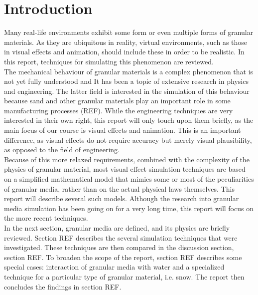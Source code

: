 
\ifx\isEmbedded\undefined

\graphicspath{{../img/}}

\fi

\section{Introduction}
Many real-life environments exhibit some form or even multiple forms of granular materials. As they are ubiquitous in reality, virtual environments, such as those in visual effects and animation, should include these in order to be realistic. In this report, techniques for simulating this phenomenon are reviewed.\\

The mechanical behaviour of granular materials is a complex phenomenon that is not yet fully understood and It has been a topic of extensive research in physics and engineering. The latter field is interested in the simulation of this behaviour because sand and other granular materials play an important role in some manufacturing processes (REF). While the engineering techniques are very interested in their own right, this report will only touch upon them briefly, as the main focus of our course is visual effects and animation. This is an important difference, as visual effects do not require accuracy but merely visual plausibility, as opposed to the field of engineering.\\

Because of this more relaxed requirements, combined with the complexity of the physics of granular material, most visual effect simulation techniques are based on a simplified mathematical model that mimics some or most of the peculiarities of granular media, rather than on the actual physical laws themselves. This report will describe several such models. Although the research into granular media simulation has been going on for a very long time, this report will focus on the more recent techniques.\\

In the next section, granular media are defined, and its physics are briefly reviewed. Section REF describes the several simulation techniques that were investigated. These techniques are then compared in the discussion section, section REF. To broaden the scope of the report, section REF describes some special cases: interaction of granular media with water and a specialized technique for a particular type of granular material, i.e. snow. The report then concludes the findings in section REF.\\

\ifx\isEmbedded\undefined


\pagebreak

\fi